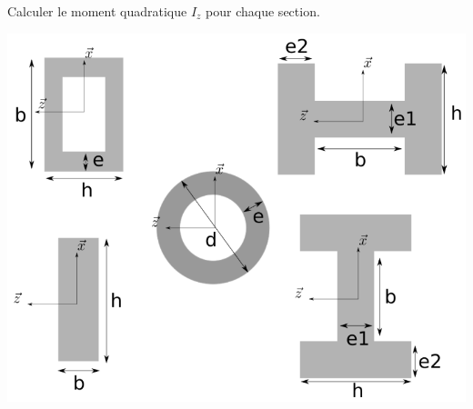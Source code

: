 \documentclass[lecture.tex]{subfiles}
\begin{document}
\exercice{}

Calculer le moment quadratique $I_z$ pour chaque section.

\begin{center}
  \includegraphics[scale=0.25]{exo-moment-quadratique-sections-usuelles.png}
\end{center}

\finexercice
\end{document}
